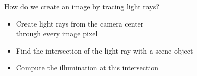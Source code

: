 \documentclass[utf8,stillsansserifmath,fleqn,t]{beamer}
\begin{document}
\begin{frame}
\frametitle{\insertsection}
How do we create an image by tracing light rays?
\begin{itemize}
\item<1-> Create light rays from the camera center\\ through every image pixel
\item<2-> Find the intersection of the light ray with a scene object
\item<3-> Compute the illumination at this intersection
\end{itemize}
\vfill
{}

\end{frame}
\end{document}
